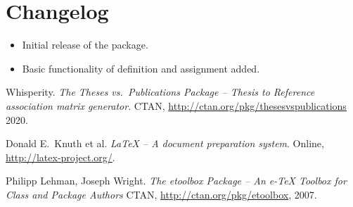 \documentclass{article}
\begin{document}

\section{Changelog}\label{changelog}
\begin{itemize}
    \item Initial release of the package.
    \item Basic functionality of definition and assignment added.
\end{itemize}


\begin{thebibliography}{3}
Whisperity. \textit{The \textsf{Theses vs.\ Publications} Package -- Thesis to Reference association matrix generator}.
CTAN, \url{http://ctan.org/pkg/thesesvspublications} 2020.

Donald E.\ Knuth et al. 
\textit{\LaTeX{} -- A document preparation system}. 
Online, \url{http://latex-project.org/}.

Philipp Lehman, Joseph Wright.
\textit{The \textsf{etoolbox} Package -- An e-\TeX{} Toolbox for Class and Package Authors}
CTAN, \url{http://ctan.org/pkg/etoolbox}, 2007.
\end{thebibliography}
\end{document}
